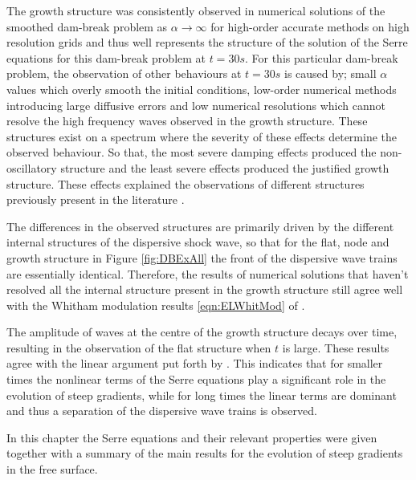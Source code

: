 The growth structure was consistently observed in numerical solutions of the smoothed dam-break problem as $\alpha \rightarrow \infty$ for high-order accurate methods on high resolution grids and thus well represents the structure of the solution of the Serre equations for this dam-break problem at $t=30s$. For this particular dam-break problem, the observation of other behaviours at $t=30s$ is caused by; small $\alpha$ values which overly smooth the initial conditions, low-order numerical methods introducing large diffusive errors and low numerical resolutions which cannot resolve the high frequency waves observed in the growth structure. These structures exist on a spectrum  where the severity of these effects determine the observed behaviour. So that, the most severe damping effects produced the non-oscillatory structure and the least severe effects produced the justified growth structure. These effects explained the observations of different structures previously present in the literature \cite{El-etal-2006,Hank-etal-2010-2034,Mitsotakis-etal-2014,Mitsotakis-etal-2017,doCarmo-etal-2018-404}. 

The differences in the observed structures are primarily driven by the different internal structures of the dispersive shock wave, so that for the flat, node and growth structure in Figure \ref{fig:DBExAll} the front of the dispersive wave trains are essentially identical. Therefore, the results of numerical solutions that haven't resolved all the internal structure present in the growth structure still agree well with the Whitham modulation results \eqref{eqn:ELWhitMod} of \citet{El-etal-2006}.

The amplitude of waves at the centre of the growth structure decays over time, resulting in the observation of the flat structure  when $t$ is large. These results agree with the linear argument put forth by \citet{Dougalis-etal-2007}. This indicates that for smaller times the nonlinear terms of the Serre equations play a significant role in the evolution of steep gradients, while for long times the linear terms are dominant and thus a separation of the dispersive wave trains is observed. 

\medskip

In this chapter the Serre equations and their relevant properties were given together with a summary of the main results for the evolution of steep gradients in the free surface. 
